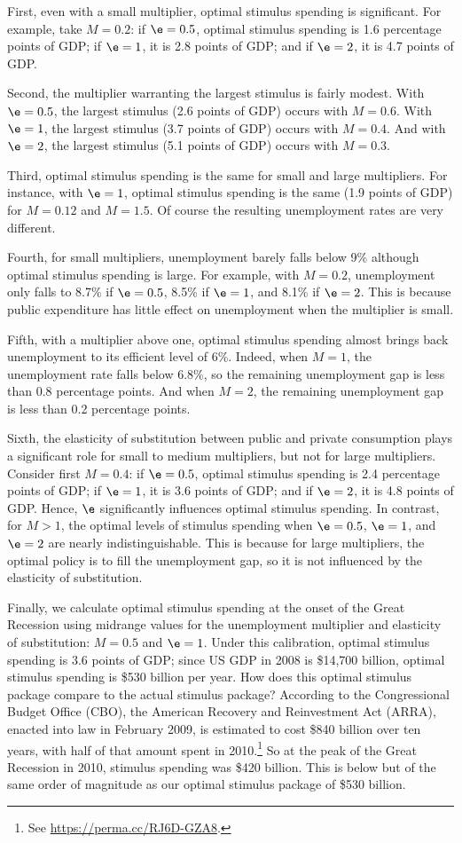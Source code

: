 \documentclass[letterpaper,12pt,leqno]{article}
\begin{document}
\begin{bibunit}
First, even with a small multiplier, optimal stimulus spending is significant. For example, take $M=0.2$: if $\e=0.5$, optimal stimulus spending is 1.6 percentage points of GDP; if $\e=1$, it is 2.8 points of GDP; and if $\e=2$, it is 4.7 points of GDP.

Second, the multiplier warranting the largest stimulus is fairly modest. With $\e=0.5$, the largest stimulus (2.6 points of GDP) occurs with $M=0.6$. With $\e=1$, the largest stimulus (3.7 points of GDP) occurs with $M=0.4$. And with $\e=2$, the largest stimulus (5.1 points of GDP) occurs with $M=0.3$.

Third, optimal stimulus spending is the same for small and large multipliers. For instance, with $\e=1$, optimal stimulus spending is the same (1.9 points of GDP) for $M=0.12$ and $M=1.5$. Of course the resulting unemployment rates are very different.

Fourth, for small multipliers, unemployment barely falls below 9\% although optimal stimulus spending is large. For example, with $M=0.2$, unemployment only falls to 8.7\% if $\e=0.5$, 8.5\% if $\e=1$, and 8.1\% if $\e=2$. This is because public expenditure has little effect on unemployment when the multiplier is small.

Fifth, with a multiplier above one, optimal stimulus spending almost brings back unemployment to its efficient level of 6\%. Indeed, when $M=1$, the unemployment rate falls below 6.8\%, so the remaining unemployment gap is less than 0.8 percentage points. And when $M=2$, the remaining unemployment gap is less than 0.2 percentage points. 

Sixth, the elasticity of substitution between public and private consumption plays a significant role for small to medium multipliers, but not for large multipliers. Consider first $M=0.4$: if $\e=0.5$, optimal stimulus spending is 2.4 percentage points of GDP; if $\e=1$, it is 3.6 points of GDP; and if $\e=2$, it is 4.8 points of GDP. Hence, $\e$ significantly influences optimal stimulus spending. In contrast, for $M>1$, the optimal levels of stimulus spending when $\e=0.5$, $\e=1$, and $\e=2$ are nearly indistinguishable. This is because for large multipliers, the optimal policy is to fill the unemployment gap, so it is not influenced by the elasticity of substitution.

Finally, we calculate optimal stimulus spending at the onset of the Great Recession using midrange values for the unemployment multiplier and elasticity of substitution: $M=0.5$ and $\e=1$. Under this calibration, optimal stimulus spending is 3.6 points of GDP; since US GDP in 2008 is \$14,700 billion, optimal stimulus spending is \$530 billion per year. How does this optimal stimulus package compare to the actual stimulus package? According to the Congressional Budget Office (CBO), the American Recovery and Reinvestment Act (ARRA), enacted into law in February 2009, is estimated to cost \$840 billion over ten years, with half of that amount spent in 2010.\footnote{See \url{https://perma.cc/RJ6D-GZA8}.} So at the peak of the Great Recession in 2010, stimulus spending was \$420 billion. This is below but of the same order of magnitude as our optimal stimulus package of \$530 billion. 


\end{bibunit}
\end{document}
